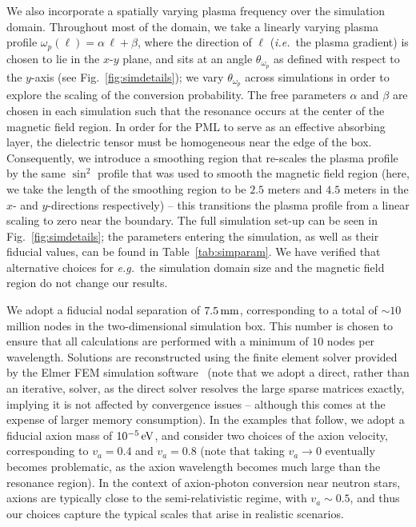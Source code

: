 \documentclass[twocolumn,superscriptaddress,floatfix,preprintnumbers,prd,nofootinbib,aps,10pt]{revtex4-2}
\renewcommand\({\left(}
\renewcommand\){\right)}
\renewcommand\[{\left[}
\renewcommand\]{\right]}
\newcommand\ie{{\it i.e.}~}
\newcommand\eg{{\it e.g.}~}
\newcommand{\sjw}[1]{{\color{red}#1}}
\begin{document}
We also incorporate a spatially varying plasma frequency over the simulation domain. Throughout most of the domain, we take a linearly varying plasma profile %
$\omega_p(\ell) = \alpha \,  \ell + \beta$, where the direction of $\ell$ (\ie the plasma gradient) is chosen to lie in the $x$-$y$ plane, and sits at an angle $\theta_{\omega_p}$ as defined with respect to the $y$-axis (see Fig.~\ref{fig:simdetails}); we vary $\theta_{\omega_p}$ across simulations in order to explore the scaling of the conversion probability. The free parameters $\alpha$ and $\beta$ are chosen in each simulation such that the resonance occurs at the center of the magnetic field region. In order for the PML to serve as an effective absorbing layer, the dielectric tensor must be homogeneous near the edge of the box. Consequently, we introduce a smoothing region that re-scales the plasma profile by the same $\sin^2$ profile that was used to smooth the magnetic field region (here, we take the length of the smoothing region to be $2.5$ meters and $4.5$ meters in the $x$- and $y$-directions respectively) -- this transitions the plasma profile from a linear scaling to zero near the boundary. The full simulation set-up can be seen in Fig.~\ref{fig:simdetails}; the parameters entering the simulation, as well as their fiducial values, can be found in Table~\ref{tab:simparam}. We have verified that alternative choices for \eg the simulation domain size and the magnetic field region do not change our results.

We adopt a fiducial nodal separation of $7.5 \, \rm mm$, corresponding to a total of $\sim 10$ million nodes in the two-dimensional simulation box. This number is chosen to ensure that all calculations are performed with a minimum of $10$ nodes per wavelength. Solutions are reconstructed using the finite element solver provided by the Elmer FEM simulation software~\cite{ElmerRef} (note that we adopt a direct, rather than an iterative, solver, as the direct solver resolves the large sparse matrices exactly, implying it is not affected by convergence issues -- although this comes at the expense of larger memory consumption). In the examples that follow, we adopt a fiducial axion mass of $10^{-5} \, \rm eV$, and consider two choices of the axion velocity, corresponding to $v_a = 0.4$ and $v_a = 0.8$ (note that taking $v_a \rightarrow 0$ eventually becomes problematic, as the axion wavelength becomes much large than the resonance region). In the context of axion-photon conversion near neutron stars, axions are typically close to the semi-relativistic regime, with $v_a \sim 0.5$, and thus our choices capture the typical scales that arise in realistic scenarios. 
\end{document}
